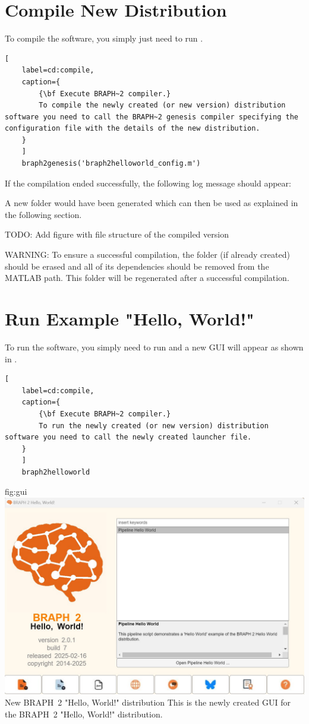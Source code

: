 \documentclass{tufte-handout}
\begin{document}
\clearpage
\section{Compile New Distribution}

To compile the software, you simply just need to run .

\begin{lstlisting}[
	label=cd:compile,
	caption={
		{\bf Execute BRAPH~2 compiler.}
		To compile the newly created (or new version) distribution software you need to call the BRAPH~2 genesis compiler specifying the configuration file with the details of the new distribution.
	}
	]
 	braph2genesis('braph2helloworld_config.m')
\end{lstlisting}

If the compilation ended successfully, the following log message should appear:\\

A new  folder would have been generated which can then be used as explained in the following section.

TODO: Add figure with file structure of the compiled version

WARNING: To ensure a successful compilation, the folder  (if already created) should be erased and all of its dependencies should be removed from the MATLAB path. This folder will be regenerated after a successful compilation.

\clearpage
\section{Run Example "Hello, World!"}

To run the software, you simply need to run  and a new GUI will appear as shown in .

\begin{lstlisting}[
	label=cd:compile,
	caption={
		{\bf Execute BRAPH~2 compiler.}
		To run the newly created (or new version) distribution software you need to call the newly created launcher file.
	}
	]
	braph2helloworld
\end{lstlisting}


	{fig:gui}
	{\includegraphics{fig02.jpg}}
	{New BRAPH~2 "Hello, World!" distribution}
	{
	This is the newly created GUI for the BRAPH~2 "Hello, World!" distribution.
	}
\end{document}
